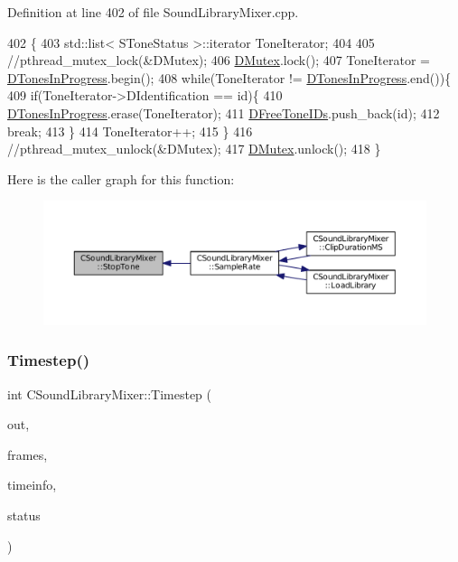 Definition at line 402 of file Sound\+Library\+Mixer.\+cpp.


\begin{DoxyCode}
402                                        \{
403     std::list< SToneStatus >::iterator ToneIterator;
404     
405     \textcolor{comment}{//pthread\_mutex\_lock(&DMutex);}
406     \hyperlink{classCSoundLibraryMixer_a955562a0638df831413a1c6b8860f9fb}{DMutex}.lock();
407     ToneIterator = \hyperlink{classCSoundLibraryMixer_a39bb9c811d842a282b6b7058ac7dfe1c}{DTonesInProgress}.begin();
408     \textcolor{keywordflow}{while}(ToneIterator != \hyperlink{classCSoundLibraryMixer_a39bb9c811d842a282b6b7058ac7dfe1c}{DTonesInProgress}.end())\{
409         \textcolor{keywordflow}{if}(ToneIterator->DIdentification == \textcolor{keywordtype}{id})\{
410             \hyperlink{classCSoundLibraryMixer_a39bb9c811d842a282b6b7058ac7dfe1c}{DTonesInProgress}.erase(ToneIterator);
411             \hyperlink{classCSoundLibraryMixer_a2d1389368651db10fd6fd8b3cd08c164}{DFreeToneIDs}.push\_back(\textcolor{keywordtype}{id});
412             \textcolor{keywordflow}{break};
413         \}
414         ToneIterator++;
415     \}
416     \textcolor{comment}{//pthread\_mutex\_unlock(&DMutex);  }
417     \hyperlink{classCSoundLibraryMixer_a955562a0638df831413a1c6b8860f9fb}{DMutex}.unlock();
418 \}
\end{DoxyCode}
Here is the caller graph for this function\+:\nopagebreak
\begin{figure}[H]
\begin{center}
\leavevmode
\includegraphics[width=350pt]{classCSoundLibraryMixer_ab57bc3217de14130ed95c48223351ce3_icgraph}
\end{center}
\end{figure}
\hypertarget{classCSoundLibraryMixer_ad3ef0b67b77862e8c88949c3415095e7}{}\label{classCSoundLibraryMixer_ad3ef0b67b77862e8c88949c3415095e7} 
\subsubsection{\texorpdfstring{Timestep()}{Timestep()}}
{\footnotesize\ttfamily int C\+Sound\+Library\+Mixer\+::\+Timestep (\begin{DoxyParamCaption}\item[{void $\ast$}]{out,  }\item[{unsigned long}]{frames,  }\item[{const Pa\+Stream\+Callback\+Time\+Info $\ast$}]{timeinfo,  }\item[{Pa\+Stream\+Callback\+Flags}]{status }\end{DoxyParamCaption})}



